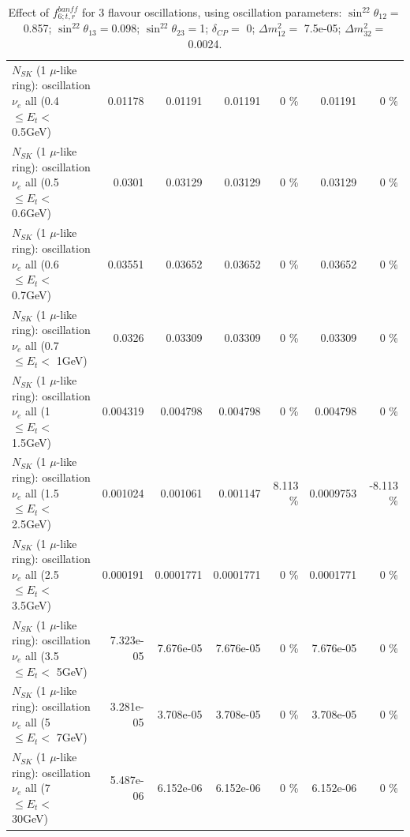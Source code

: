 \begin{table}
\begin{tabular}{| l | r | r | r  r | r  r |}
$N_{SK}$ (1 $\mu$-like ring): oscillation $\nu_{e}$ all (0.4 $\leq E_{t} <$ 0.5GeV) &         0.01178 &         0.01191 &         0.01191 &        0 \%  &         0.01191 &        0 \%  \\ 
$N_{SK}$ (1 $\mu$-like ring): oscillation $\nu_{e}$ all (0.5 $\leq E_{t} <$ 0.6GeV) &          0.0301 &         0.03129 &         0.03129 &        0 \%  &         0.03129 &        0 \%  \\ 
$N_{SK}$ (1 $\mu$-like ring): oscillation $\nu_{e}$ all (0.6 $\leq E_{t} <$ 0.7GeV) &         0.03551 &         0.03652 &         0.03652 &        0 \%  &         0.03652 &        0 \%  \\ 
$N_{SK}$ (1 $\mu$-like ring): oscillation $\nu_{e}$ all (0.7 $\leq E_{t} <$ 1GeV) &          0.0326 &         0.03309 &         0.03309 &        0 \%  &         0.03309 &        0 \%  \\ 
$N_{SK}$ (1 $\mu$-like ring): oscillation $\nu_{e}$ all (1 $\leq E_{t} <$ 1.5GeV) &        0.004319 &        0.004798 &        0.004798 &        0 \%  &        0.004798 &        0 \%  \\ 
$N_{SK}$ (1 $\mu$-like ring): oscillation $\nu_{e}$ all (1.5 $\leq E_{t} <$ 2.5GeV) &        0.001024 &        0.001061 &        0.001147 &    8.113 \%  &       0.0009753 &   -8.113 \%  \\ 
$N_{SK}$ (1 $\mu$-like ring): oscillation $\nu_{e}$ all (2.5 $\leq E_{t} <$ 3.5GeV) &        0.000191 &       0.0001771 &       0.0001771 &        0 \%  &       0.0001771 &        0 \%  \\ 
$N_{SK}$ (1 $\mu$-like ring): oscillation $\nu_{e}$ all (3.5 $\leq E_{t} <$ 5GeV) &       7.323e-05 &       7.676e-05 &       7.676e-05 &        0 \%  &       7.676e-05 &        0 \%  \\ 
 $N_{SK}$ (1 $\mu$-like ring): oscillation $\nu_{e}$ all (5 $\leq E_{t} <$ 7GeV) &       3.281e-05 &       3.708e-05 &       3.708e-05 &        0 \%  &       3.708e-05 &        0 \%  \\ 
$N_{SK}$ (1 $\mu$-like ring): oscillation $\nu_{e}$ all (7 $\leq E_{t} <$ 30GeV) &       5.487e-06 &       6.152e-06 &       6.152e-06 &        0 \%  &       6.152e-06 &        0 \%  \\ 
\hline
\hline
\end{tabular}
\caption{ Effect of $f_{6; t, r}^{banff}$ for 3 flavour oscillations, using oscillation parameters:  $\sin^22\theta_{12} = $0.857; $\sin^22\theta_{13} = $0.098; $\sin^22\theta_{23} = $1; $\delta_{CP} = $        0; $\Delta m^2_{12} = $    7.5e-05; $\Delta m^2_{32} = $    0.0024. }
\label{tab:num_banff_06_1RmuT_3f_osc_t13:0.098}
\end{table}
